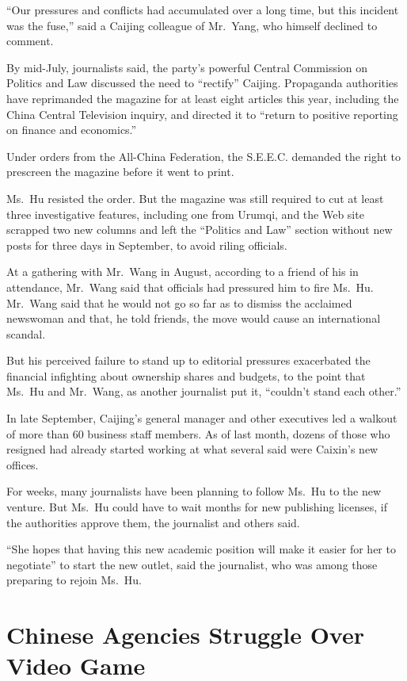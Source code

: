 ﻿\documentclass[12pt]{article}
\begin{document}
``Our pressures and conflicts had accumulated over a long time, but this incident was the fuse,''
said a Caijing colleague of Mr.~Yang, who himself declined to comment.

By mid-July, journalists said, the party's powerful Central Commission on Politics and Law discussed
the need to ``rectify'' Caijing. Propaganda authorities have reprimanded the magazine for at least
eight articles this year, including the China Central Television inquiry, and directed it to
``return to positive reporting on finance and economics.''

Under orders from the All-China Federation, the S.E.E.C. demanded the right to prescreen the
magazine before it went to print.

Ms.~Hu resisted the order. But the magazine was still required to cut at least three investigative
features, including one from Urumqi, and the Web site scrapped two new columns and left the
``Politics and Law'' section without new posts for three days in September, to avoid riling
officials.

At a gathering with Mr.~Wang in August, according to a friend of his in attendance, Mr.~Wang said
that officials had pressured him to fire Ms.~Hu. Mr.~Wang said that he would not go so far as to
dismiss the acclaimed newswoman and that, he told friends, the move would cause an international
scandal.

But his perceived failure to stand up to editorial pressures exacerbated the financial infighting
about ownership shares and budgets, to the point that Ms.~Hu and Mr.~Wang, as another journalist put
it, ``couldn't stand each other.''

In late September, Caijing's general manager and other executives led a walkout of more than 60
business staff members. As of last month, dozens of those who resigned had already started working
at what several said were Caixin's new offices.

For weeks, many journalists have been planning to follow Ms.~Hu to the new venture. But Ms.~Hu could
have to wait months for new publishing licenses, if the authorities approve them, the journalist and
others said.

``She hopes that having this new academic position will make it easier for her to negotiate'' to
start the new outlet, said the journalist, who was among those preparing to rejoin Ms.~Hu.

\section{Chinese Agencies Struggle Over Video Game}
\end{document}
